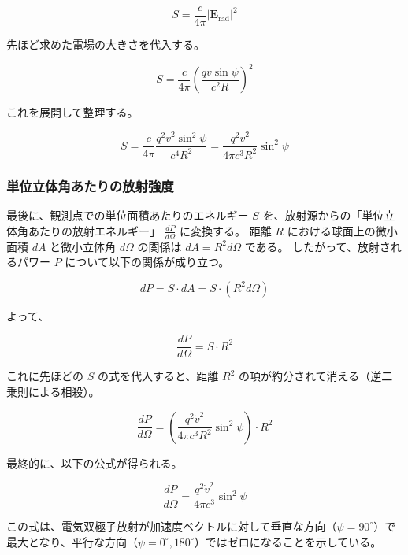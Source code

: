 \documentclass[a4paper,11pt]{bxjsarticle} %
\begin{document}
\begin{equation}
    S = \frac{c}{4\pi} |\bm{E}_{\mathrm{rad}}|^2
\end{equation}

先ほど求めた電場の大きさを代入する。

\begin{equation}
    S = \frac{c}{4\pi} \left( \frac{q \dot{v} \sin\psi}{c^2 R} \right)^2
\end{equation}

これを展開して整理する。

\begin{equation}
    S = \frac{c}{4\pi} \frac{q^2 \dot{v}^2 \sin^2\psi}{c^4 R^2} = \frac{q^2 \dot{v}^2}{4\pi c^3 R^2} \sin^2\psi
\end{equation}

\subsubsection{単位立体角あたりの放射強度}

最後に、観測点での単位面積あたりのエネルギー $S$ を、放射源からの「単位立体角あたりの放射エネルギー」 $\frac{dP}{d\Omega}$ に変換する。
距離 $R$ における球面上の微小面積 $dA$ と微小立体角 $d\Omega$ の関係は $dA = R^2 d\Omega$ である。
したがって、放射されるパワー $P$ について以下の関係が成り立つ。

\begin{equation}
    dP = S \cdot dA = S \cdot (R^2 d\Omega)
\end{equation}

よって、

\begin{equation}
    \frac{dP}{d\Omega} = S \cdot R^2
\end{equation}

これに先ほどの $S$ の式を代入すると、距離 $R^2$ の項が約分されて消える（逆二乗則による相殺）。

\begin{equation}
    \frac{dP}{d\Omega} = \left( \frac{q^2 \dot{v}^2}{4\pi c^3 R^2} \sin^2\psi \right) \cdot R^2
\end{equation}

最終的に、以下の公式が得られる。

\begin{equation}
    \frac{dP}{d\Omega} = \frac{q^2 \dot{v}^2}{4\pi c^3} \sin^2\psi
\end{equation}

この式は、電気双極子放射が加速度ベクトルに対して垂直な方向（$\psi = 90^\circ$）で最大となり、平行な方向（$\psi = 0^\circ, 180^\circ$）ではゼロになることを示している。
\end{document}
